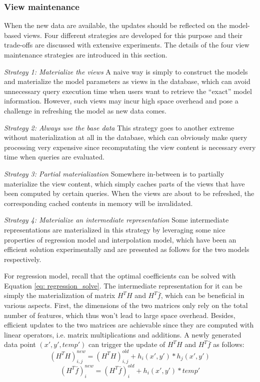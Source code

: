 \subsubsection{View maintenance}
When the new data are available, the updates should be reflected on the model-based views. Four different strategies are developed for this purpose and their trade-offs are discussed with extensive experiments. The details of the four view maintenance strategies are introduced in this section.

\textit{Strategy 1: Materialize the views}
A naive way is simply to construct the models and materialize the model parameters as views in the database, which can avoid unnecessary query execution time when users want to retrieve the ``exact'' model information. However, such views may incur high space overhead and pose a challenge in refreshing the model as new data comes.

\textit{Strategy 2: Always use the base data}
This strategy goes to another extreme without materialization at all in the database, which can obviously make query processing very expensive since recomputating the view content is necessary every time when queries are evaluated. 

\textit{Strategy 3: Partial materialization}
Somewhere in-between is to partially materialize the view content, which simply caches parts of the views that have been computed by certain queries. When the views are about to be refreshed, the corresponding cached contents in memory will be invalidated.

\textit{Strategy 4: Materialize an intermediate representation}
Some intermediate representations are materialized in this strategy by leveraging some nice properties of regression model and interpolation model, which have been an efficient solution experimentally and are presented as follows for the two models respectively.

For regression model, recall that the optimal coefficients can be solved with Equation \ref{eq: regression_solve}. The intermediate representation for it can be simply the materialization of matrix $H^TH$ and $H^T\bar{f}$, which can be beneficial in various aspects. First, the dimensions of the two matrices only rely on the total number of features, which thus won't lead to large space overhead. Besides, efficient updates to the two matrices are achievable since they are computed with linear operators, i.e. matrix multiplications and additions. A newly generated data point $(x',y', temp')$ can trigger the update of $H^TH$ and $H^T\bar{f}$ as follows:
\begin{equation}
    (H^TH)^{new}_{i,j} = (H^TH)^{old}_{i,j} + h_i(x',y')*h_j(x',y')
\end{equation}
\begin{equation}
    (H^T\bar{f})^{new}_i = (H^T\bar{f})^{old}_i + h_i(x',y')*temp'
\end{equation}

